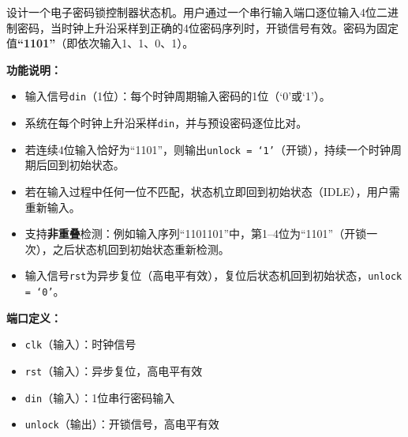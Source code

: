 设计一个电子密码锁控制器状态机。用户通过一个串行输入端口逐位输入4位二进制密码，当时钟上升沿采样到正确的4位密码序列时，开锁信号有效。密码为固定值\textbf{``1101''}（即依次输入1、1、0、1）。

\vspace{0.3cm}

\textbf{功能说明：}
\begin{itemize}
  \item 输入信号\texttt{din}（1位）：每个时钟周期输入密码的1位（`0'或`1'）。
  \item 系统在每个时钟上升沿采样\texttt{din}，并与预设密码逐位比对。
  \item 若连续4位输入恰好为``1101''，则输出\texttt{unlock = `1'}（开锁），持续一个时钟周期后回到初始状态。
  \item 若在输入过程中任何一位不匹配，状态机立即回到初始状态（IDLE），用户需重新输入。
  \item 支持\textbf{非重叠}检测：例如输入序列``1101101''中，第1--4位为``1101''（开锁一次），之后状态机回到初始状态重新检测。
  \item 输入信号\texttt{rst}为异步复位（高电平有效），复位后状态机回到初始状态，\texttt{unlock = `0'}。
\end{itemize}

\vspace{0.3cm}

\textbf{端口定义：}
\begin{itemize}
  \item \texttt{clk}（输入）：时钟信号
  \item \texttt{rst}（输入）：异步复位，高电平有效
  \item \texttt{din}（输入）：1位串行密码输入
  \item \texttt{unlock}（输出）：开锁信号，高电平有效
\end{itemize}

\vspace{0.3cm}

